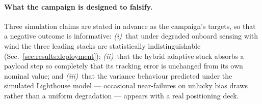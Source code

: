 \paragraph{What the campaign is designed to falsify.}
Three simulation claims are stated in advance as the campaign's targets, so that a
negative outcome is informative: \emph{(i)}~that under degraded onboard sensing with
wind the three leading stacks are statistically indistinguishable
(Sec.~\ref{sec:results:deployment}); \emph{(ii)}~that the hybrid adaptive stack absorbs
a payload step so completely that its tracking error is unchanged from its own nominal
value; and \emph{(iii)}~that the variance behaviour predicted under the simulated
Lighthouse model --- occasional near-failures on unlucky bias draws rather than a
uniform degradation --- appears with a real positioning deck.
